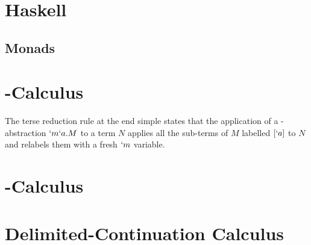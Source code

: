 \section{Haskell}
\subsection{Monads}

\section{\lmu-Calculus}

\begin{figure}[!h]
\end{figure}

\begin{figure}[!h]
\end{figure}

The terse reduction rule at the end simple states that the application of a \lmu-abstraction $`m`a.M$ to a term $N$ applies all the sub-terms of $M$ labelled $[`a]$ to $N$ and relabels them with a fresh $`m$ variable.

\section{\ltry-Calculus}

\section{Delimited-Continuation Calculus}

